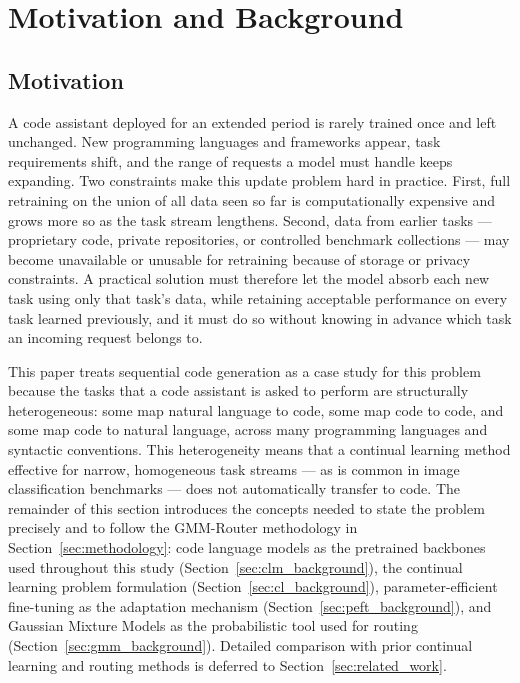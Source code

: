 \section{Motivation and Background}
\label{sec:background}

\subsection{Motivation}
\label{sec:motivation}

A code assistant deployed for an extended period is rarely trained once and left unchanged. New programming languages and frameworks appear, task requirements shift, and the range of requests a model must handle keeps expanding. Two constraints make this update problem hard in practice. First, full retraining on the union of all data seen so far is computationally expensive and grows more so as the task stream lengthens. Second, data from earlier tasks --- proprietary code, private repositories, or controlled benchmark collections --- may become unavailable or unusable for retraining because of storage or privacy constraints. A practical solution must therefore let the model absorb each new task using only that task's data, while retaining acceptable performance on every task learned previously, and it must do so without knowing in advance which task an incoming request belongs to.

This paper treats sequential code generation as a case study for this problem because the tasks that a code assistant is asked to perform are structurally heterogeneous: some map natural language to code, some map code to code, and some map code to natural language, across many programming languages and syntactic conventions. This heterogeneity means that a continual learning method effective for narrow, homogeneous task streams --- as is common in image classification benchmarks --- does not automatically transfer to code. The remainder of this section introduces the concepts needed to state the problem precisely and to follow the GMM-Router methodology in Section~\ref{sec:methodology}: code language models as the pretrained backbones used throughout this study (Section~\ref{sec:clm_background}), the continual learning problem formulation (Section~\ref{sec:cl_background}), parameter-efficient fine-tuning as the adaptation mechanism (Section~\ref{sec:peft_background}), and Gaussian Mixture Models as the probabilistic tool used for routing (Section~\ref{sec:gmm_background}). Detailed comparison with prior continual learning and routing methods is deferred to Section~\ref{sec:related_work}.

